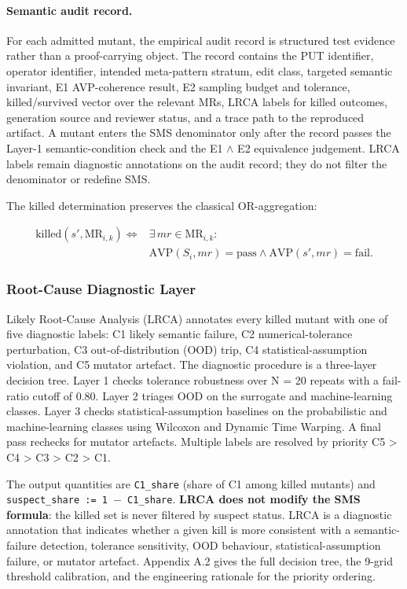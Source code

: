 \documentclass[manuscript,screen,review]{acmart}
\begin{document}
\paragraph{Semantic audit record.}
For each admitted mutant, the empirical audit record is structured
test evidence rather than a proof-carrying object. The record contains the PUT
identifier, operator identifier, intended meta-pattern stratum, edit
class, targeted semantic invariant, E1 AVP-coherence result, E2 sampling
budget and tolerance, killed/survived vector over the relevant MRs, LRCA
labels for killed outcomes, generation source and reviewer status, and a
trace path to the reproduced artifact. A mutant enters the SMS
denominator only after the record passes the Layer-1 semantic-condition
check and the E1 $\wedge$ E2 equivalence judgement. LRCA labels remain
diagnostic annotations on the audit record; they do not filter the
denominator or redefine SMS.

The killed determination preserves the classical OR-aggregation:

\[
\begin{aligned}
\mathrm{killed}(s', \mathrm{MR}_{i,k}) \iff{} & \exists\,mr \in \mathrm{MR}_{i,k}: \\
& \mathrm{AVP}(S_i, mr) = \text{pass} \wedge
  \mathrm{AVP}(s', mr) = \text{fail}.
\end{aligned}
\]

\subsubsection{Root-Cause Diagnostic Layer}\label{lrca-engineering-attribution-layer-descriptive-not-in-sms}

Likely Root-Cause Analysis (LRCA) annotates every killed mutant with one
of five diagnostic labels: C1 likely semantic failure, C2
numerical-tolerance perturbation, C3 out-of-distribution (OOD) trip, C4
statistical-assumption violation, and C5 mutator artefact. The diagnostic
procedure is a three-layer decision tree.
Layer 1 checks tolerance robustness over N = 20 repeats with a
fail-ratio cutoff of 0.80. Layer 2 triages OOD on the surrogate and
machine-learning classes. Layer 3 checks statistical-assumption
baselines on the probabilistic and machine-learning classes using
Wilcoxon and Dynamic Time Warping. A final pass rechecks for mutator
artefacts. Multiple labels are resolved by priority C5 \textgreater{} C4
\textgreater{} C3 \textgreater{} C2 \textgreater{} C1.

The output quantities are \texttt{C1\_share} (share of C1 among killed
mutants) and \texttt{suspect\_share\ :=\ 1\ $-$\ C1\_share}. \textbf{LRCA
does not modify the SMS formula}: the killed set is never filtered by
suspect status. LRCA is a diagnostic annotation that indicates
whether a given kill is more consistent with a semantic-failure
detection, tolerance sensitivity, OOD behaviour, statistical-assumption
failure, or mutator artefact. Appendix A.2 gives the full decision tree, the 9-grid
threshold calibration, and the engineering rationale for the priority
ordering.
\end{document}
